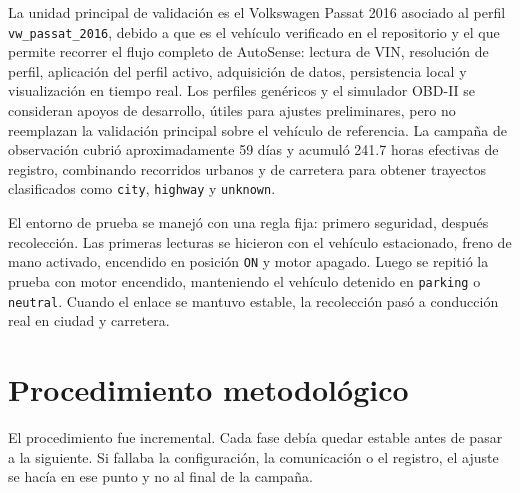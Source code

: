 \documentclass[12pt,letterpaper]{report}
\begin{document}
La unidad principal de validación es el Volkswagen Passat 2016 asociado al perfil \texttt{vw\_passat\_2016}, debido a que es el vehículo verificado en el repositorio y el que permite recorrer el flujo completo de AutoSense: lectura de VIN, resolución de perfil, aplicación del perfil activo, adquisición de datos, persistencia local y visualización en tiempo real. Los perfiles genéricos y el simulador OBD-II se consideran apoyos de desarrollo, útiles para ajustes preliminares, pero no reemplazan la validación principal sobre el vehículo de referencia. La campaña de observación cubrió aproximadamente 59 días y acumuló 241.7 horas efectivas de registro, combinando recorridos urbanos y de carretera para obtener trayectos clasificados como \texttt{city}, \texttt{highway} y \texttt{unknown}.

El entorno de prueba se manejó con una regla fija: primero seguridad, después recolección. Las primeras lecturas se hicieron con el vehículo estacionado, freno de mano activado, encendido en posición \texttt{ON} y motor apagado. Luego se repitió la prueba con motor encendido, manteniendo el vehículo detenido en \texttt{parking} o \texttt{neutral}. Cuando el enlace se mantuvo estable, la recolección pasó a conducción real en ciudad y carretera.

\section{Procedimiento metodológico}

\label{sec:procedimiento-metodologico}

El procedimiento fue incremental. Cada fase debía quedar estable antes de pasar a la siguiente. Si fallaba la configuración, la comunicación o el registro, el ajuste se hacía en ese punto y no al final de la campaña.
\end{document}
